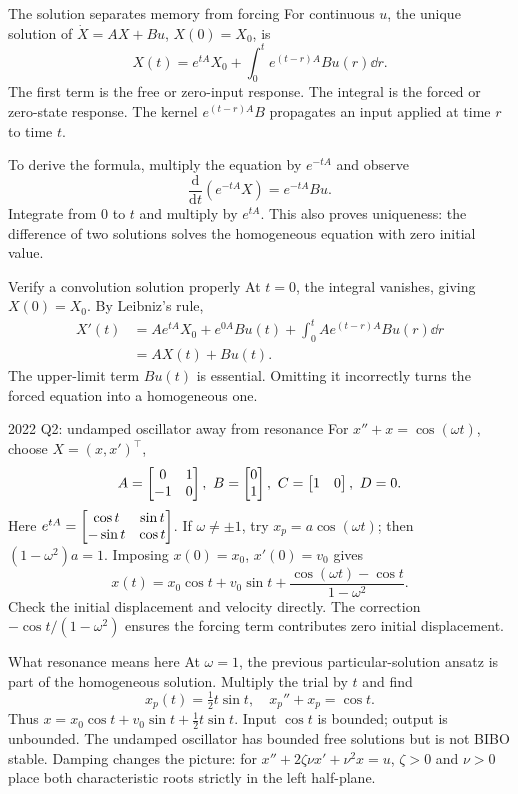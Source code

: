 \begin{concept}{The solution separates memory from forcing}
For continuous $u$, the unique solution of $\dot X=AX+Bu$, $X(0)=X_0$, is
\[X(t)=e^{tA}X_0+\int_0^t e^{(t-r)A}Bu(r)\dd r.\]
The first term is the free or zero-input response. The integral is the forced or zero-state response. The kernel $e^{(t-r)A}B$ propagates an input applied at time $r$ to time $t$.

To derive the formula, multiply the equation by $e^{-tA}$ and observe
\[\frac{\mathrm d}{\mathrm dt}(e^{-tA}X)=e^{-tA}Bu.\]
Integrate from $0$ to $t$ and multiply by $e^{tA}$. This also proves uniqueness: the difference of two solutions solves the homogeneous equation with zero initial value.
\end{concept}
\begin{method}{Verify a convolution solution properly}
At $t=0$, the integral vanishes, giving $X(0)=X_0$. By Leibniz's rule,
\begin{align*}
X'(t)&=Ae^{tA}X_0+e^{0A}Bu(t)+\int_0^t Ae^{(t-r)A}Bu(r)\dd r\\
&=AX(t)+Bu(t).
\end{align*}
The upper-limit term $Bu(t)$ is essential. Omitting it incorrectly turns the forced equation into a homogeneous one.
\end{method}
\begin{worked}{2022 Q2: undamped oscillator away from resonance}
For $x''+x=\cos(\omega t)$, choose $X=(x,x')^{\top}$,
\[A=\mat{0&1\\-1&0},\ B=\mat{0\\1},\ C=\mat{1&0},\ D=0.\]
Here $e^{tA}=\begin{bmatrix}\cos t&\sin t\\-\sin t&\cos t\end{bmatrix}$. If $\omega\ne\pm1$, try $x_p=a\cos(\omega t)$; then $(1-\omega^2)a=1$. Imposing $x(0)=x_0$, $x'(0)=v_0$ gives
\[x(t)=x_0\cos t+v_0\sin t+\frac{\cos(\omega t)-\cos t}{1-\omega^2}.\]
Check the initial displacement and velocity directly. The correction $-\cos t/(1-\omega^2)$ ensures the forcing term contributes zero initial displacement.
\end{worked}
\begin{concept}{What resonance means here}
At $\omega=1$, the previous particular-solution ansatz is part of the homogeneous solution. Multiply the trial by $t$ and find
\[x_p(t)=\tfrac12t\sin t,\quad x_p''+x_p=\cos t.\]
Thus $x=x_0\cos t+v_0\sin t+\frac12t\sin t$. Input $\cos t$ is bounded; output is unbounded. The undamped oscillator has bounded free solutions but is not BIBO stable. Damping changes the picture: for $x''+2\zeta\nu x'+\nu^2x=u$, $\zeta>0$ and $\nu>0$ place both characteristic roots strictly in the left half-plane.
\end{concept}
